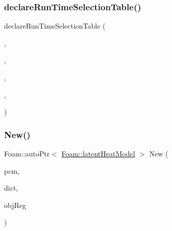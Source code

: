 \mbox{\label{classFoam_1_1latentHeatModel_a7dad5c1f3225a9a8cf50fe66693c8769}} 
\subsubsection{\texorpdfstring{declare\+Run\+Time\+Selection\+Table()}{declareRunTimeSelectionTable()}}
{\footnotesize\ttfamily declare\+Run\+Time\+Selection\+Table (\begin{DoxyParamCaption}\item[{auto\+Ptr}]{,  }\item[{\hyperlink{classFoam_1_1latentHeatModel}{latent\+Heat\+Model}}]{,  }\item[{latent\+Heat\+Models}]{,  }\item[{(const \hyperlink{classFoam_1_1phaseChangeModel}{phase\+Change\+Model} \&pcm, const dictionary \&dict, const object\+Registry \&obj\+Reg)}]{,  }\item[{(pcm, dict, obj\+Reg)}]{ }\end{DoxyParamCaption})}

\mbox{\label{classFoam_1_1latentHeatModel_a446c6d4a78e7c47527b2ada3b5c1f13f}} 
\subsubsection{\texorpdfstring{New()}{New()}}
{\footnotesize\ttfamily Foam\+::auto\+Ptr$<$ \hyperlink{classFoam_1_1latentHeatModel}{Foam\+::latent\+Heat\+Model} $>$ New (\begin{DoxyParamCaption}\item[{const \hyperlink{classFoam_1_1phaseChangeModel}{phase\+Change\+Model} \&}]{pcm,  }\item[{const dictionary \&}]{dict,  }\item[{const object\+Registry \&}]{obj\+Reg }\end{DoxyParamCaption})\hspace{0.3cm}{\ttfamily [static]}}



